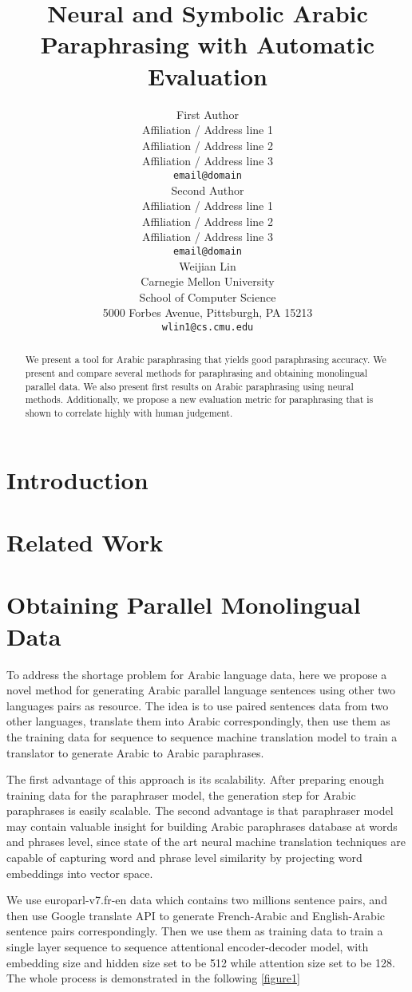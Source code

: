 \documentclass[11pt,letterpaper]{article}
\title{Neural and Symbolic Arabic Paraphrasing with Automatic Evaluation}
\author{First Author \\
  Affiliation / Address line 1 \\
  Affiliation / Address line 2 \\
  Affiliation / Address line 3 \\
  {\tt email@domain} \\\And
  Second Author \\
  Affiliation / Address line 1 \\
  Affiliation / Address line 2 \\
  Affiliation / Address line 3 \\
  {\tt email@domain} \\\And
  Weijian Lin \\
 Carnegie Mellon University\\
 School of Computer Science \\ 
 5000 Forbes Avenue, Pittsburgh, PA 15213 \\
  {\tt wlin1@cs.cmu.edu} \\}
\date{}
\begin{document}
\maketitle
\begin{abstract}

	We present a tool for Arabic paraphrasing that yields good paraphrasing accuracy.  We present and compare several methods for paraphrasing and obtaining monolingual parallel data. We also present first results on Arabic paraphrasing using neural methods. Additionally, we propose a new evaluation metric for paraphrasing that is shown to correlate highly with human judgement.
\end{abstract}


\section{Introduction}

\section{Related Work}

\section{Obtaining Parallel Monolingual Data}

	To address the shortage problem for Arabic language data, here we propose a novel method for generating Arabic parallel language sentences using other two languages pairs as resource. The idea is to use paired sentences data from two other languages, translate them into Arabic correspondingly, then use them as the  training data for sequence to sequence machine translation model to train a translator  to generate Arabic to Arabic paraphrases.
  
	The first advantage of this approach is its scalability. After preparing enough training data for the paraphraser model, the generation step for Arabic paraphrases is easily scalable. The second advantage is that paraphraser model may contain valuable insight for  building Arabic paraphrases database at  words and phrases level, since state of the art neural machine translation techniques are capable of capturing word and phrase level similarity by projecting word embeddings into vector space.
	
	We use europarl-v7.fr-en data which contains two millions sentence pairs, and then use Google translate API to generate French-Arabic and English-Arabic sentence pairs correspondingly. Then we use them as training data to train a single layer sequence to sequence attentional encoder-decoder model, with embedding size and hidden size set to be 512 while attention size set to be 128. The whole process is demonstrated in the following  \ref{figure1}
\end{document}
